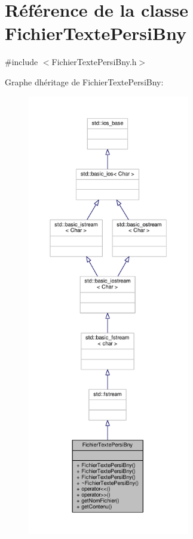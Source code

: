 \hypertarget{classFichierTextePersiBny}{}\section{Référence de la classe Fichier\+Texte\+Persi\+Bny}
\label{classFichierTextePersiBny}


{\ttfamily \#include $<$Fichier\+Texte\+Persi\+Bny.\+h$>$}



Graphe d\textquotesingle{}héritage de Fichier\+Texte\+Persi\+Bny\+:
\nopagebreak
\begin{figure}[H]
\begin{center}
\leavevmode
\includegraphics[height=550pt]{classFichierTextePersiBny__inherit__graph}
\end{center}
\end{figure}



